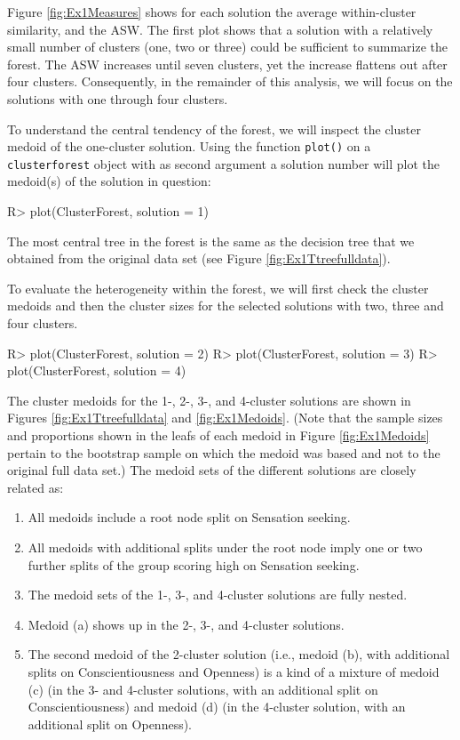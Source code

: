Figure \ref{fig:Ex1Measures} shows for each solution the average within-cluster similarity, and the ASW. The first plot shows that a solution with a relatively small number of clusters (one, two or three) could be sufficient to summarize the forest. The ASW increases until seven clusters, yet the increase flattens out after four clusters. Consequently, in the remainder of this analysis, we will focus on the solutions with one through four clusters.

To understand the central tendency of the forest, we will inspect the cluster medoid of the one-cluster solution. Using the function \texttt{plot()} on a \texttt{clusterforest} object with as second argument a solution number will plot the medoid(s) of the solution in question:
\begin{example}
R> plot(ClusterForest, solution = 1)
\end{example}
The most central tree in the forest is the same as the decision tree that we obtained from the original data set (see Figure \ref{fig:Ex1Ttreefulldata}). 

To evaluate the heterogeneity within the forest, we will first check the cluster medoids and then the cluster sizes for the selected solutions with two, three and four clusters. 
\begin{example}
R> plot(ClusterForest, solution = 2)
R> plot(ClusterForest, solution = 3)
R> plot(ClusterForest, solution = 4)
\end{example}

The cluster medoids for the 1-, 2-, 3-, and 4-cluster solutions are shown in Figures \ref{fig:Ex1Ttreefulldata} and \ref{fig:Ex1Medoids}. (Note that the sample sizes and proportions shown in the leafs of each medoid in Figure \ref{fig:Ex1Medoids} pertain to the bootstrap sample on which the medoid was based and not to the original full data set.) The medoid sets of the different solutions are closely related as: 
\begin{enumerate}
\item All medoids include a root node split on Sensation seeking.
\item All medoids with additional splits under the root node imply one or two further splits of the group scoring high on Sensation seeking.
\item The medoid sets of the 1-, 3-, and 4-cluster solutions are fully nested.
\item Medoid (a) shows up in the 2-, 3-, and 4-cluster solutions. 
\item The second medoid of the 2-cluster solution (i.e., medoid (b), with additional splits on Conscientiousness and Openness) is a kind of a mixture of medoid (c) (in the 3- and 4-cluster solutions, with an additional split on Conscientiousness) and medoid (d) (in the 4-cluster solution, with an additional split on Openness).
\end{enumerate}

